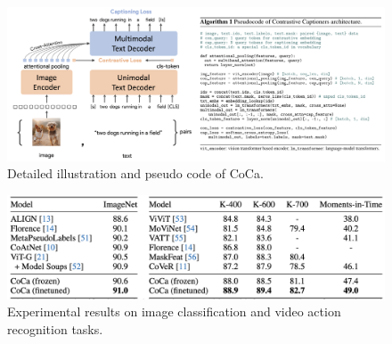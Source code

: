 \documentclass[10pt,twocolumn,letterpaper]{article}
\begin{document}
\begin{figure}[t]
    \includegraphics[width=\linewidth]{assets/coca_detail.png}
    \caption{\label{fig:detail}Detailed illustration and pseudo code of CoCa.}
\end{figure}

\begin{figure}[t]
    \includegraphics[width=\linewidth]{assets/experiment.png}
    \caption{\label{fig:experiment}Experimental results on image classification and video action recognition tasks.}
\end{figure}



{\small


}
\end{document}
